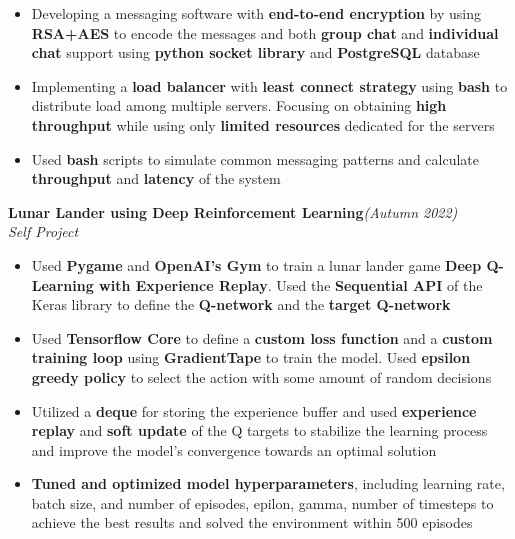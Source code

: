 \documentclass[a4paper,10pt]{article}
\begin{document}
\begin{itemize}[itemsep = -0.65 mm, leftmargin=*]
    \item Developing a messaging software with \textbf{end-to-end encryption} by using \textbf{RSA+AES} to encode the messages and both \textbf{group chat} and \textbf{individual chat} support using \textbf{python socket library} and \textbf{PostgreSQL} database
    \item Implementing a \textbf{load balancer} with \textbf{least connect strategy} using \textbf{bash} to distribute load among multiple servers. Focusing on obtaining \textbf{high throughput} while using only \textbf{limited resources} dedicated for the servers
    \item Used \textbf{bash} scripts to simulate common messaging patterns and calculate \textbf{throughput} and \textbf{latency} of the system
\end{itemize}
\vspace{\baselineskip}
\vspace{-15pt}
\noindent\textbf{\large Lunar Lander using Deep Reinforcement Learning}\hfill{\sl \small (Autumn 2022)}\\
{\it Self Project}
\\\vspace{-15pt}
\begin{itemize}[itemsep = -0.65 mm, leftmargin=*]
    \item Used \textbf{Pygame} and \textbf{OpenAI's Gym} to train a lunar lander game \textbf{Deep Q-Learning with Experience Replay}. Used the \textbf{Sequential API} of the Keras library to define the \textbf{Q-network} and the \textbf{target Q-network}
    \item Used \textbf{Tensorflow Core} to define a \textbf{custom loss function} and a \textbf{custom training loop} using \textbf{GradientTape} to train the model. Used \textbf{epsilon greedy policy} to select the action with some amount of random decisions
    \item Utilized a \textbf{deque} for storing the experience buffer and used \textbf{experience replay} and \textbf{soft update} of the Q targets to stabilize the learning process and improve the model's convergence towards an optimal solution
    \item \textbf{Tuned and optimized model hyperparameters}, including learning rate, batch size, and number of episodes, epilon, gamma, number of timesteps to achieve the best results and solved the environment within 500 episodes
\end{itemize}
\end{document}
